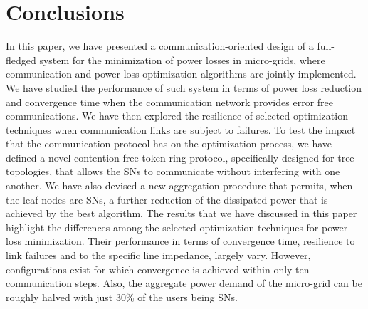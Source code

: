 \documentclass[journal]{IEEEtran}
\begin{document}
\section{Conclusions}
\label{sec:conclusions}
In this paper, we have presented a communication-oriented design of a full-fledged system for the minimization of power losses in micro-grids, where communication and power loss optimization algorithms are jointly implemented. We have studied the performance of such system in terms of power loss reduction and convergence time when the communication network provides error free communications. We have then explored the resilience of selected optimization techniques when communication links are subject to failures. To test the impact that the communication protocol has on the optimization process, we have defined a novel contention free token ring protocol, specifically designed for tree topologies, that allows the SNs to communicate without interfering with one another. We have also devised a new aggregation procedure that permits, when the leaf nodes are SNs, a further reduction of the dissipated power that is achieved by the best algorithm. The results that we have discussed in this paper highlight the differences among the selected optimization techniques for power loss minimization. Their performance in terms of convergence time, resilience to link failures and to the specific line impedance, largely vary. However, configurations exist for which convergence is achieved within only ten communication steps. Also, the aggregate power demand of the micro-grid can be roughly halved with just $30$\% of the users being SNs. 




\nocite{*}

\enlargethispage{-45mm}
\end{document}
